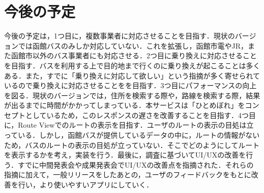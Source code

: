 \chapter{今後の予定}
今後の予定は，1つ目に，複数事業者に対応させることを目指す．現状のバージョンでは函館バスのみしか対応していない．これを拡張し，函館市電やJR，また函館市以外のバス事業者にも対応させる．2つ目に乗り換えに対応させることを目指す．バスを利用する上で目的地まで行くのに乗り換えが起こることは多くある．また，すでに「乗り換えに対応して欲しい」という指摘が多く寄せられているので乗り換えに対応させることをを目指す．3つ目にパフォーマンスの向上を図る．現状のバージョンでは，住所を検索する際や，路線を検索する際，結果が出るまでに時間がかかってしまっている．本サービスは「ひとめぼれ」をコンセプトとしているため，このレスポンスの遅さを改善することを目指す．4つ目に，Route Viewでのルートの表示を目指す．ユーザのルートの表示の目処は立っている．しかし，函館バスが提供しているデータの中に，ルートの情報がないため，バスのルートの表示の目処が立っていない．そこでどのようにしてルートを表示するかを考え，実装を行う．最後に，調査に基づいてUI/UXの改善を行う．すでに中間発表会や成果発表会でUI/UXの改善点を指摘された．それらの指摘に加えて，一般リリースをしたあとの，ユーザのフィードバックをもとに改善を行い，より使いやすいアプリにしていく．
